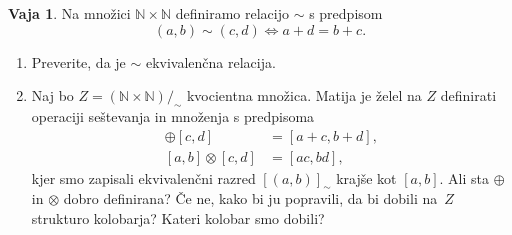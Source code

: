 \documentclass{article}
\newcommand{\NN}{\mathbb{N}}
\theoremstyle{definition}
\newtheorem{vaja}{Vaja}
\begin{document}
\begin{vaja}
  Na množici $\NN \times \NN$ definiramo relacijo $\sim$ s predpisom
  \begin{equation*}
    (a,b) \sim (c,d) \iff a + d = b + c.
  \end{equation*}
  \begin{enumerate}
    \item
      Preverite, da je $\sim$ ekvivalenčna relacija.
    \item
      Naj bo $Z = (\NN \times \NN)/_\sim$ kvocientna množica. Matija je želel na $Z$ definirati operaciji seštevanja in množenja s predpisoma
      \begin{align*}
        [a,b] \oplus [c,d] &= [a+c, b+d],\\
        [a,b] \otimes [c,d] &= [a c, b d],
      \end{align*}
      kjer smo zapisali ekvivalenčni razred $[(a,b)]_\sim$ krajše kot $[a,b]$. Ali sta $\oplus$ in $\otimes$ dobro definirana? Če ne, kako bi ju popravili, da bi dobili na~$Z$ strukturo kolobarja? Kateri kolobar smo dobili?
  \end{enumerate}
\end{vaja}
\end{document}
